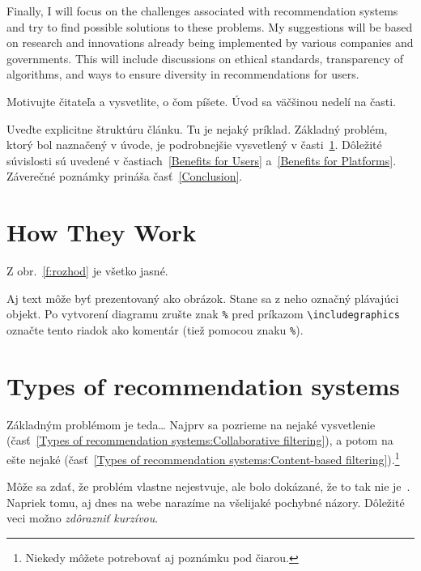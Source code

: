 \documentclass[10pt,twoside,slovak,a4paper]{article}
\begin{document}
Finally, I will focus on the challenges associated with recommendation systems and try to find possible solutions to these problems. My suggestions will be based on research and innovations already being implemented by various companies and governments. This will include discussions on ethical standards, transparency of algorithms, and ways to ensure diversity in recommendations for users.





Motivujte čitateľa a vysvetlite, o čom píšete. Úvod sa väčšinou nedelí na časti.

Uveďte explicitne štruktúru článku. Tu je nejaký príklad.
Základný problém, ktorý bol naznačený v úvode, je podrobnejšie vysvetlený v časti~\ref{How They Work}.
Dôležité súvislosti sú uvedené v častiach~\ref{Benefits for Users} a~\ref{Benefits for Platforms}.
Záverečné poznámky prináša časť~\ref{Conclusion}.



\section{How They Work} \label{How They Work}

Z obr.~\ref{f:rozhod} je všetko jasné. 

\begin{figure*}[tbh]
\centering
Aj text môže byť prezentovaný ako obrázok. Stane sa z neho označný plávajúci objekt. Po vytvorení diagramu zrušte znak \texttt{\%} pred príkazom \verb|\includegraphics| označte tento riadok ako komentár (tiež pomocou znaku \texttt{\%}).
\caption{Rozhodujúci argument.}
\label{f:rozhod}
\end{figure*}



\section{Types of recommendation systems} \label{Types of recommendation systems}

Základným problémom je teda\ldots{} Najprv sa pozrieme na nejaké vysvetlenie (časť~\ref{Types of recommendation systems:Collaborative filtering}), a potom na ešte nejaké (časť~\ref{Types of recommendation systems:Content-based filtering}).\footnote{Niekedy môžete potrebovať aj poznámku pod čiarou.}

Môže sa zdať, že problém vlastne nejestvuje\cite{Coplien:MPD}, ale bolo dokázané, že to tak nie je~\cite{Czarnecki:Staged, Czarnecki:Progress}. Napriek tomu, aj dnes na webe narazíme na všelijaké pochybné názory\cite{PLP-Framework}. Dôležité veci možno \emph{zdôrazniť kurzívou}.
\end{document}
